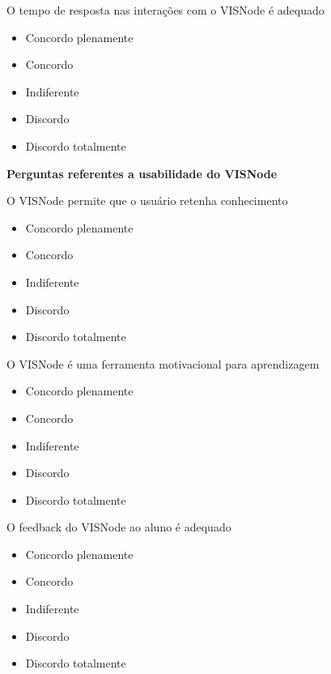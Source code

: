 \documentclass[
	12pt,				%
	oneside,			%
	a4paper,			%
	english,			%
	french,				%
	spanish,			%
	brazil,				%
	]{abntex2}
\makeatletter
\newcommand*{\radiobutton}{%
  \@ifstar{\@radiobutton0}{\@radiobutton1}%
}
\newcommand*{\@radiobutton}[1]{%
  \begin{tikzpicture}
    \pgfmathsetlengthmacro\radius{height("X")/2}
    \draw[radius=\radius] circle;
    \ifcase#1 \fill[radius=.6*\radius] circle;\fi
  \end{tikzpicture}%
}
\makeatother
\begin{document}
\begin{apendicesenv}
\noindent O tempo de resposta nas interações com o VISNode é adequado

\begin{itemize}
\item[\radiobutton] Concordo plenamente
\item[\radiobutton] Concordo
\item[\radiobutton] Indiferente
\item[\radiobutton] Discordo
\item[\radiobutton] Discordo totalmente
\end{itemize}

\vspace{3mm}

\noindent\textbf{Perguntas referentes a usabilidade do VISNode}

\vspace{3mm}

\noindent O VISNode permite que o usuário retenha conhecimento

\begin{itemize}
\item[\radiobutton] Concordo plenamente
\item[\radiobutton] Concordo
\item[\radiobutton] Indiferente
\item[\radiobutton] Discordo
\item[\radiobutton] Discordo totalmente
\end{itemize}

\noindent O VISNode é uma ferramenta motivacional para aprendizagem

\begin{itemize}
\item[\radiobutton] Concordo plenamente
\item[\radiobutton] Concordo
\item[\radiobutton] Indiferente
\item[\radiobutton] Discordo
\item[\radiobutton] Discordo totalmente
\end{itemize}

\noindent O feedback do VISNode ao aluno é adequado

\begin{itemize}
\item[\radiobutton] Concordo plenamente
\item[\radiobutton] Concordo
\item[\radiobutton] Indiferente
\item[\radiobutton] Discordo
\item[\radiobutton] Discordo totalmente
\end{itemize}


\end{apendicesenv}
\end{document}
